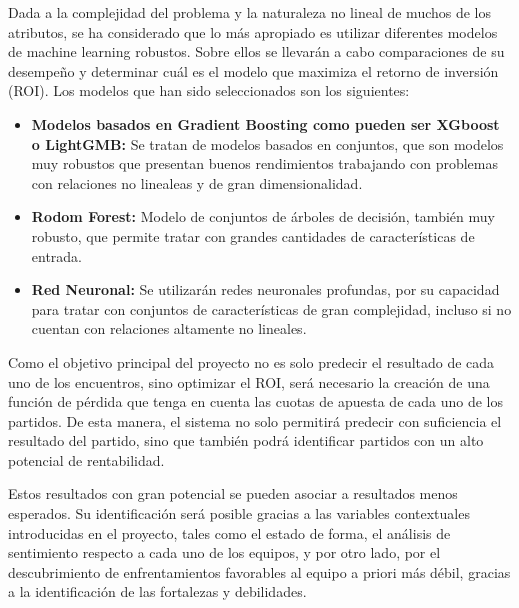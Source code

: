 Dada a la complejidad del problema y la naturaleza no lineal de muchos de los atributos, se ha considerado que lo más apropiado es utilizar diferentes modelos de machine learning robustos. Sobre ellos se llevarán a cabo comparaciones de su desempeño y determinar cuál es el modelo que maximiza el retorno de inversión (ROI). Los modelos que han sido seleccionados son los siguientes:

\begin{itemize}
    \item \textbf{Modelos basados en Gradient Boosting como pueden ser XGboost o LightGMB:} Se tratan de modelos basados en conjuntos, que son modelos muy robustos que presentan buenos rendimientos trabajando con problemas con relaciones no linealeas y de gran dimensionalidad.
    \item \textbf{Rodom Forest:} Modelo de conjuntos de árboles de decisión, también muy robusto, que permite tratar con grandes cantidades de características de entrada.
    \item \textbf{Red Neuronal:} Se utilizarán redes neuronales profundas, por su capacidad para tratar con conjuntos de características de gran complejidad, incluso si no cuentan con relaciones altamente no lineales.
\end{itemize}


Como el objetivo principal del proyecto no es solo predecir el resultado de cada uno de los encuentros, sino optimizar el ROI, será necesario la creación de una función de pérdida que tenga en cuenta las cuotas de apuesta de cada uno de los partidos. De esta manera, el sistema no solo permitirá predecir con suficiencia el resultado del partido, sino que también podrá identificar partidos con un alto potencial de rentabilidad.

Estos resultados con gran potencial se pueden asociar a resultados menos esperados. Su identificación será posible gracias a las variables contextuales introducidas en el proyecto, tales como el estado de forma, el análisis de sentimiento respecto a cada uno de los equipos, y por otro lado, por el descubrimiento de enfrentamientos favorables al equipo a priori más débil, gracias a la identificación de las fortalezas y debilidades.


